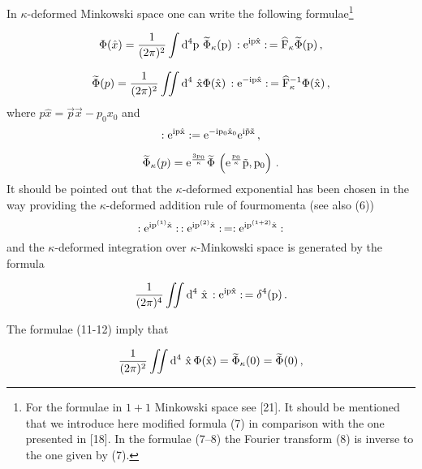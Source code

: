 \documentclass[a4paper,a4paper]{article}
\newcommand\E{\rm e}
\newcommand\D{\rm d }
\begin{document}
In $\kappa$-deformed Minkowski space one can write the following 
formulae\footnote{For the formulae in $1+1$ Minkowski space see 
[21]. It
  should be mentioned that we introduce here modified
formula (7) in comparison with the one presented in [18]. In
the formulae (7--8) the Fourier transform (8) is inverse to
the  one given by (7).}

\begin{equation}
\Phi(\hat{x}) =
{1\over (2\pi)^{2}} \int \D^4 p\  \widetilde{\Phi}_{\kappa}
(p)\, : \E^{ip\hat{x}}:\, = \widehat{F}_{\kappa}
\widetilde{\Phi}(p)\, ,
\end{equation}

\begin{equation}
{\widetilde{\Phi}} (p) =
{1\over (2\pi)^{2}} 
 \int\!\!\!\int \D^4\  {\hat{x}}
 {\Phi} ({\hat{x}} ) 
\, : \E^{-ip\hat{x}}:\, = \widehat{F}_{\kappa}^{-1}
{\Phi}({\hat{x}})\, ,
\end{equation}
where $p\hat{x}=\vec{p}\vec{x} - p_{0}x_{0}$ and
\begin{equation}
 : \E^{ip\hat{x}}: =   \E^{- ip_{0}\hat{x}_{0}}
   \E^{i\vec{p}\vec{x}}\, ,
\end{equation}


\begin{equation}
\widetilde{\Phi}_{\kappa}(p)  =   \E^{ {3p_{0}\over \kappa}}
{\widetilde{\Phi}}\, \left( 
  \E^{{p_{0}\over \kappa}}\vec{p}, p_{0}\right)\, .
\end{equation}
It should be pointed out that the $\kappa$-deformed exponential 
has
been chosen in the way providing the $\kappa$-deformed addition
rule of fourmomenta  (see also (6))
\begin{equation}
 : \E^{ip^{(1)}\hat{x}}: \, :  
  \E^{ip^{(2)}\hat{x}}: \,  =
 :  \E^{ip^{(1+2)}\hat{x}}: 
 \end{equation}
and the $\kappa$-deformed integration over
$\kappa$-Minkowski space is generated by the formula

\begin{equation}
{1\over (2\pi)^{4}}
\int\!\!\!\int \D^{4}\ \hat{x}\, : \E^{ip\hat{x}}: \, =
\delta^{4} (p)\, .
\end{equation}

The formulae (11-12) imply that

\begin{equation}
{1\over (2\pi)^{2}}
\int\!\!\!\int \D^{4}\  {\hat{x}} \, \Phi({\hat{x}}) =
{\widetilde{\Phi}}_{\kappa} (0) = {\widetilde{\Phi}} (0)\, ,
\end{equation}
\end{document}
